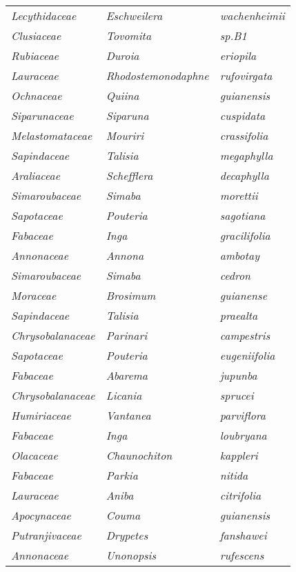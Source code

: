 \documentclass[fleqn,10pt]{ArtEcoFoG} %
\renewenvironment{table}{\begin{table*}}{\end{table*}\ignorespacesafterend}
\begin{document}
\begin{table}
\begin{tabular}[t]{lll}
\em{Lecythidaceae} & \em{Eschweilera} & \em{wachenheimii}\\
\em{Clusiaceae} & \em{Tovomita} & \em{sp.B1}\\
\em{Rubiaceae} & \em{Duroia} & \em{eriopila}\\
\em{Lauraceae} & \em{Rhodostemonodaphne} & \em{rufovirgata}\\
\addlinespace
\em{Ochnaceae} & \em{Quiina} & \em{guianensis}\\
\em{Siparunaceae} & \em{Siparuna} & \em{cuspidata}\\
\em{Melastomataceae} & \em{Mouriri} & \em{crassifolia}\\
\em{Sapindaceae} & \em{Talisia} & \em{megaphylla}\\
\em{Araliaceae} & \em{Schefflera} & \em{decaphylla}\\
\addlinespace
\em{Simaroubaceae} & \em{Simaba} & \em{morettii}\\
\em{Sapotaceae} & \em{Pouteria} & \em{sagotiana}\\
\em{Fabaceae} & \em{Inga} & \em{gracilifolia}\\
\em{Annonaceae} & \em{Annona} & \em{ambotay}\\
\em{Simaroubaceae} & \em{Simaba} & \em{cedron}\\
\addlinespace
\em{Moraceae} & \em{Brosimum} & \em{guianense}\\
\em{Sapindaceae} & \em{Talisia} & \em{praealta}\\
\em{Chrysobalanaceae} & \em{Parinari} & \em{campestris}\\
\em{Sapotaceae} & \em{Pouteria} & \em{eugeniifolia}\\
\em{Fabaceae} & \em{Abarema} & \em{jupunba}\\
\addlinespace
\em{Chrysobalanaceae} & \em{Licania} & \em{sprucei}\\
\em{Humiriaceae} & \em{Vantanea} & \em{parviflora}\\
\em{Fabaceae} & \em{Inga} & \em{loubryana}\\
\em{Olacaceae} & \em{Chaunochiton} & \em{kappleri}\\
\em{Fabaceae} & \em{Parkia} & \em{nitida}\\
\addlinespace
\em{Lauraceae} & \em{Aniba} & \em{citrifolia}\\
\em{Apocynaceae} & \em{Couma} & \em{guianensis}\\
\em{Putranjivaceae} & \em{Drypetes} & \em{fanshawei}\\
\em{Annonaceae} & \em{Unonopsis} & \em{rufescens}\\

\end{tabular}
\end{table}
\end{document}
